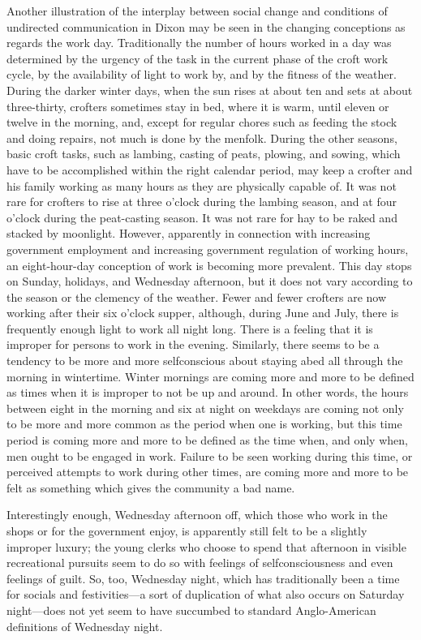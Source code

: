 \documentclass[openany,nobib]{tufte-book}
\begin{document}
Another illustration of the interplay between social change and
conditions of undirected communication in Dixon may be seen in the
changing conceptions as regards the work day. Traditionally the number
of hours worked in a day was determined by the urgency of the task in
the current phase of the croft work cycle, by the availability of light
to work by, and by the fitness of the weather. During the darker winter
days, when the sun rises at about ten and sets at about three-thirty,
crofters sometimes stay in bed, where it is warm, until eleven or twelve
in the morning, and, except for regular chores such as feeding the stock
and doing repairs, not much is done by the menfolk. During the other
seasons, basic croft tasks, such as lambing, casting of peats, plowing,
and sowing, which have to be accomplished within the right calendar
period, may keep a crofter and his family working as many hours as they
are physically capable of. It was not rare for crofters to rise at three
o'clock during the lambing season, and at four o'clock during the
peat-casting season. It was not rare for hay to be raked and stacked by
moonlight. However, apparently in connection with increasing government
employment and increasing government regulation of working hours, an
eight-hour-day conception of work is becoming more prevalent. This day
stops on Sunday, holidays, and Wednesday afternoon, but it does not vary
according to the season or the clemency of the weather. Fewer and fewer
crofters are now working after their six o'clock supper, although,
during June and July, there is frequently enough light to work all night
long. There is a feeling that it is improper for persons to work in the
evening. Similarly, there seems to be a tendency to be more and more
selfconscious about staying abed all through the morning in wintertime.
Winter mornings are coming more and more to be defined as times when it
is improper to not be up and around. In other words, the hours between
eight in the morning and six at night on weekdays are coming not only to
be more and more common as the period when one is working, but this time
period is coming more and more to be defined as the time when, and only
when, men ought to be engaged in work. Failure to be seen working during
this time, or perceived attempts to work during other times, are coming
more and more to be felt as something which gives the community a bad
name.

\enlargethispage{\baselineskip}

Interestingly enough, Wednesday afternoon off, which those who work in
the shops or for the government enjoy, is apparently still felt to be a
slightly improper luxury; the young clerks who choose to spend that
afternoon in visible recreational pursuits seem to do so with feelings
of selfconsciousness and even feelings of guilt. So, too, Wednesday
night, which has traditionally been a time for socials and
festivities---a sort of duplication of what also occurs on Saturday
night---does not yet seem to have succumbed to standard Anglo-American
definitions of Wednesday night.
\end{document}
